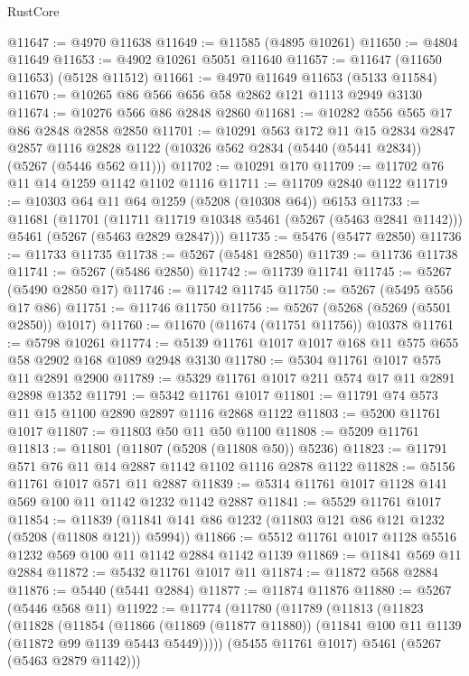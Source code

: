 \begin{lexlean}{RustCore}
\begin{coremodule}
@11647 := @4970 @11638
@11649 := @11585 (@4895 @10261)
@11650 := @4804 @11649
@11653 := @4902 @10261 @5051 @11640
@11657 := @11647 (@11650 @11653) (@5128 @11512)
@11661 := @4970 @11649 @11653 (@5133 @11584)
@11670 := @10265 @86 @566 @656 @58 @2862 @121 @1113 @2949 @3130
@11674 := @10276 @566 @86 @2848 @2860
@11681 := @10282 @556 @565 @17 @86 @2848 @2858 @2850
@11701 := @10291
    @563
    @172
    @11
    @15
    @2834
    @2847
    @2857
    @1116
    @2828
    @1122
    (@10326 @562 @2834 (@5440 (@5441 @2834)) (@5267 (@5446 @562 @11)))
@11702 := @10291 @170
@11709 := @11702 @76 @11 @14 @1259 @1142 @1102 @1116
@11711 := @11709 @2840 @1122
@11719 := @10303 @64 @11 @64 @1259 (@5208 (@10308 @64)) @6153
@11733 := @11681
    (@11701
      (@11711 @11719 @10348 @5461 (@5267 (@5463 @2841 @1142)))
      @5461
      (@5267 (@5463 @2829 @2847)))
@11735 := @5476 (@5477 @2850)
@11736 := @11733 @11735
@11738 := @5267 (@5481 @2850)
@11739 := @11736 @11738
@11741 := @5267 (@5486 @2850)
@11742 := @11739 @11741
@11745 := @5267 (@5490 @2850 @17)
@11746 := @11742 @11745
@11750 := @5267 (@5495 @556 @17 @86)
@11751 := @11746 @11750
@11756 := @5267 (@5268 (@5269 (@5501 @2850)) @1017)
@11760 := @11670 (@11674 (@11751 @11756)) @10378
@11761 := @5798 @10261
@11774 := @5139 @11761 @1017 @1017 @168 @11 @575 @655 @58 @2902 @168 @1089 @2948 @3130
@11780 := @5304 @11761 @1017 @575 @11 @2891 @2900
@11789 := @5329 @11761 @1017 @211 @574 @17 @11 @2891 @2898 @1352
@11791 := @5342 @11761 @1017
@11801 := @11791 @74 @573 @11 @15 @1100 @2890 @2897 @1116 @2868 @1122
@11803 := @5200 @11761 @1017
@11807 := @11803 @50 @11 @50 @1100
@11808 := @5209 @11761
@11813 := @11801 (@11807 (@5208 (@11808 @50)) @5236)
@11823 := @11791 @571 @76 @11 @14 @2887 @1142 @1102 @1116 @2878 @1122
@11828 := @5156 @11761 @1017 @571 @11 @2887
@11839 := @5314 @11761 @1017 @1128 @141 @569 @100 @11 @1142 @1232 @1142 @2887
@11841 := @5529 @11761 @1017
@11854 := @11839 (@11841 @141 @86 @1232 (@11803 @121 @86 @121 @1232 (@5208 (@11808 @121)) @5994))
@11866 := @5512 @11761 @1017 @1128 @5516 @1232 @569 @100 @11 @1142 @2884 @1142 @1139
@11869 := @11841 @569 @11 @2884
@11872 := @5432 @11761 @1017 @11
@11874 := @11872 @568 @2884
@11876 := @5440 (@5441 @2884)
@11877 := @11874 @11876
@11880 := @5267 (@5446 @568 @11)
@11922 := @11774
    (@11780
      (@11789
        (@11813
          (@11823
            (@11828
              (@11854
                (@11866
                  (@11869 (@11877 @11880))
                  (@11841 @100 @11 @1139 (@11872 @99 @1139 @5443 @5449)))))
            (@5455 @11761 @1017)
            @5461
            (@5267 (@5463 @2879 @1142)))

\end{coremodule}
\end{lexlean}
